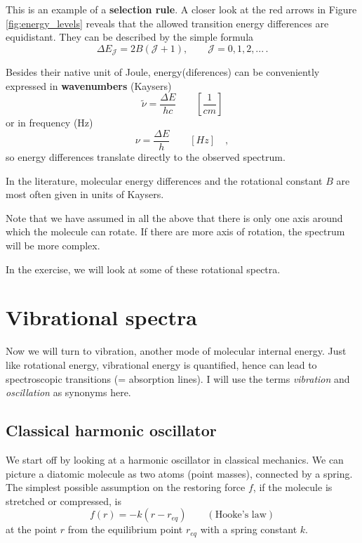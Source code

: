 This is an example of a \textbf{selection rule}. A closer look at the
red arrows in Figure \ref{fig:energy_levels} reveals that the allowed
transition energy differences are equidistant. They can be described
by the simple formula
\begin{equation}
\Delta E_\mathcal{J} = 2B(\mathcal{J}+1), \qquad \mathcal{J} = 0, 1, 2, ...\,.
\end{equation}

Besides their native unit of Joule,
energy(diferences) can be conveniently expressed in
\textbf{wavenumbers} (Kaysers)
\begin{equation}
\tilde{\nu} = \frac{\Delta E}{hc} \qquad \left[\frac{1}{cm}\right]
\end{equation}
or in frequency (Hz)
\begin{equation}
\nu = \frac{\Delta E}{h} \qquad \left[Hz\right] \quad ,
\end{equation}
so energy differences translate directly to the observed spectrum.

In the literature, molecular energy differences and the rotational
constant $B$ are most often given in
units of Kaysers.

Note that we have assumed in all the above that there is only one
axis around which the molecule can rotate. If there are more axis of
rotation, the spectrum will be more complex.

In the exercise, we will look at some of these rotational spectra.


\clearpage
\section{Vibrational spectra}
Now we will turn to vibration, another mode of molecular internal
energy. Just like rotational energy, vibrational energy is quantified,
hence can lead to spectroscopic transitions (= absorption lines). I
will use the terms \emph{vibration} and \emph{oscillation} as synonyms here.

\subsection{Classical harmonic oscillator}
We start off by looking at a harmonic oscillator in classical
mechanics. We can picture a diatomic molecule as two atoms (point
masses), connected by a spring. The simplest possible assumption on
the restoring force $f$, if the molecule is stretched or compressed,
is
\begin{equation}
\label{eq:hooke}
f(r) = -k (r-r_{eq}) \qquad (\text{Hooke's law})
\end{equation}
at the point $r$ from the equilibrium point $r_{eq}$ with a spring
constant $k$. 

